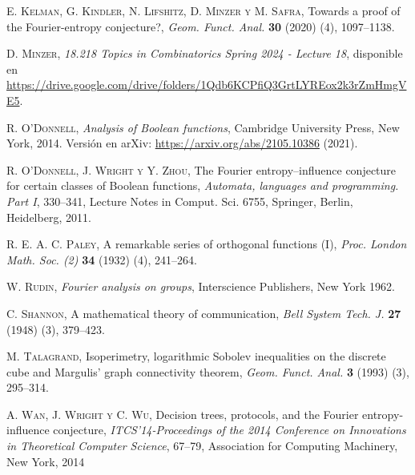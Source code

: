 \documentclass[autocontact]{gaceta}
\begin{document}
\begin{thebibliography}{09}
\textsc{E. Kelman, G. Kindler, N. Lifshitz, D. Minzer y M. Safra},
Towards a proof of the Fourier-entropy conjecture?,
\textit{Geom. Funct. Anal.} \textbf{30} (2020) (4), 1097--1138.

\textsc{D. Minzer},
\textit{18.218 Topics in Combinatorics Spring 2024 - Lecture 18},
disponible en \url{https://drive.google.com/drive/folders/1Qdb6KCPfiQ3GrtLYREox2k3rZmHmgVE5}.

\textsc{R. O'Donnell},
\textit{Analysis of Boolean functions},
Cambridge University Press, New York, 2014.
Versión en arXiv: \url{https://arxiv.org/abs/2105.10386} (2021).

\textsc{R. O’Donnell, J. Wright y Y. Zhou},
The Fourier entropy–influence conjecture for certain classes of Boolean functions,
\textit{Automata, languages and programming. Part I}, 330--341,
Lecture Notes in Comput. Sci. 6755, Springer, Berlin, Heidelberg, 2011.

\textsc{R. E. A. C. Paley},
A remarkable series of orthogonal functions (I),
\textit{Proc. London Math. Soc. (2)} \textbf{34} (1932) (4), 241--264.

\textsc{W. Rudin},
\textit{Fourier analysis on groups},
Interscience Publishers, New York 1962.

\textsc{C. Shannon},
A mathematical theory of communication,
\textit{Bell System Tech. J.} \textbf{27} (1948) (3), 379--423.

\textsc{M. Talagrand},
Isoperimetry, logarithmic Sobolev inequalities on the discrete cube and Margulis’ graph connectivity theorem,
\textit{Geom. Funct. Anal.} \textbf{3} (1993) (3), 295--314.

\textsc{A. Wan, J. Wright y C. Wu},
Decision trees, protocols, and the Fourier entropy-influence conjecture,
\textit{ITCS'14-Proceedings of the 2014 Conference on Innovations in Theoretical Computer Science}, 67–79,
Association for Computing Machinery, New York, 2014

\end{thebibliography}

\end{document}
